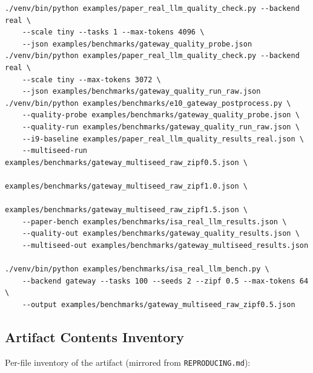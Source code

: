 \documentclass[
  11pt,
]{article}
\begin{document}
\begin{verbatim}
./venv/bin/python examples/paper_real_llm_quality_check.py --backend real \
    --scale tiny --tasks 1 --max-tokens 4096 \
    --json examples/benchmarks/gateway_quality_probe.json
./venv/bin/python examples/paper_real_llm_quality_check.py --backend real \
    --scale tiny --max-tokens 3072 \
    --json examples/benchmarks/gateway_quality_run_raw.json
./venv/bin/python examples/benchmarks/e10_gateway_postprocess.py \
    --quality-probe examples/benchmarks/gateway_quality_probe.json \
    --quality-run examples/benchmarks/gateway_quality_run_raw.json \
    --i9-baseline examples/paper_real_llm_quality_results_real.json \
    --multiseed-run examples/benchmarks/gateway_multiseed_raw_zipf0.5.json \
                    examples/benchmarks/gateway_multiseed_raw_zipf1.0.json \
                    examples/benchmarks/gateway_multiseed_raw_zipf1.5.json \
    --paper-bench examples/benchmarks/isa_real_llm_results.json \
    --quality-out examples/benchmarks/gateway_quality_results.json \
    --multiseed-out examples/benchmarks/gateway_multiseed_results.json

./venv/bin/python examples/benchmarks/isa_real_llm_bench.py \
    --backend gateway --tasks 100 --seeds 2 --zipf 0.5 --max-tokens 64 \
    --output examples/benchmarks/gateway_multiseed_raw_zipf0.5.json
\end{verbatim}

\subsection{Artifact Contents
Inventory}\label{artifact-contents-inventory}

Per-file inventory of the artifact (mirrored from
\texttt{REPRODUCING.md}):
\end{document}
